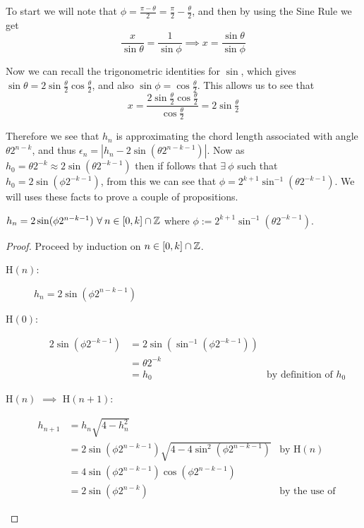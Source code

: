To start we will note that \(\phi = \frac{\pi - \theta}{2} = \frac{\pi}{2} - \frac{\theta}{2}\), and then by using the Sine Rule we get 
\[\frac{x}{\sin\theta} = \frac{1}{\sin\phi} \implies x = \frac{\sin\theta}{\sin\phi}\]

Now we can recall the trigonometric identities for \(\sin\), which gives \(\sin\theta = 2\sin\frac{\theta}{2}\cos\frac{\theta}{2}\), and also \(\sin\phi = \cos\frac{\theta}{2}\). This allows us to see that
\[x = \frac{2\sin\frac{\theta}{2}\cos\frac{\theta}{2}}{\cos\frac{\theta}{2}} = 2\sin\tfrac{\theta}{2}\]

Therefore we see that \(h_n\) is approximating the chord length associated with angle \(\theta2^{n-k}\), and thus \(\epsilon_n = |h_n - 2\sin(\theta2^{n-k-1})|\). Now as \(h_0 =\theta2^{-k} \approx 2\sin(\theta2^{-k-1})\) then if follows that \(\exists\: \phi\) such that \(h_0 = 2\sin(\phi2^{-k-1})\), from this we can see that \(\phi = 2^{k+1}\sin^{-1}(\theta2^{-k-1})\). We will uses these facts to prove a couple of propositions.

\begin{Geo Trig Prop 1}
\label{THM_"Geo Trig Prop 1"}
\(h_n = 2\sin(\phi2^{n-k-1})\ \forall\: n \in [0, k] \cap \mathbb{Z}\) where \(\phi := 2^{k+1}\sin^{-1}(\theta2^{-k-1})\).
\end{Geo Trig Prop 1}
\begin{proof}
Proceed by induction on \(n \in [0, k]\cap\mathbb{Z}\).\\
\begin{description}
\item [\textrm{H\((n)\):}] \(h_n = 2\sin(\phi2^{n-k-1})\)
\item [\textrm{H\((0)\):}] 
	\begin{displaymath}
		\begin{align*}
			2\sin(\phi2^{-k-1}) &= 2\sin(\sin^{-1}(\phi2^{-k-1}))\\
								&= \theta2^{-k}\\
								&= h_0 & \textrm{by definition of } h_0
		\end{align*}
	\end{displaymath}
\item [\textrm{H\((n)\) \(\implies\) H\((n+1)\):}]
	\begin{displaymath}
		\begin{align*}
			h_{n+1} &= h_n\sqrt{4-h_n^2}\\
					&= 2\sin(\phi2^{n-k-1})\sqrt{4-4\sin^2(\phi2^{n-k-1})}
						&\textrm{by H\((n)\)}\\
					&= 4\sin(\phi2^{n-k-1})\cos(\phi2^{n-k-1})\\
					&= 2\sin(\phi2^{n-k})
						&\textrm{by the use of double angle formulas}
		\end{align*}
	\end{displaymath}
\end{description}
\end{proof}

